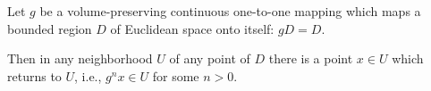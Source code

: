 Let $g$ be a volume-preserving continuous one-to-one mapping which maps a bounded region $D$ of Euclidean space onto itself: $gD = D$.

Then in any neighborhood $U$ of any point of $D$ there is a point $x \in U$ which returns to $U$, i.e., $g^n x \in U$ for some $n > 0$.
